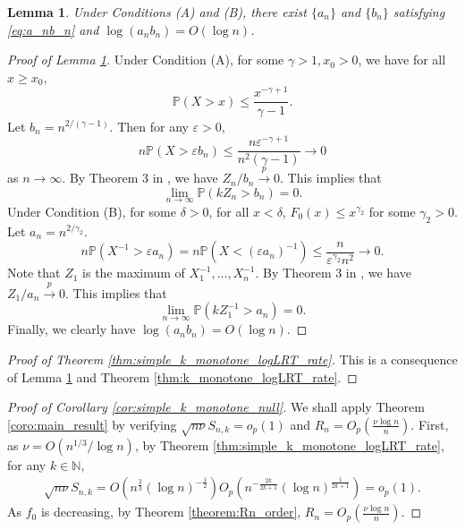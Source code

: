 \documentclass[12pt,letterpaper, twoside, openany]{article}
\theoremstyle{plain}
\newtheorem{lemma}[theorem]{Lemma}
\begin{document}
\begin{lemma}\label{lemma:anbn_logn_hall}
    Under Conditions (A) and (B), there exist $\{a_n\}$ and $\{b_n\}$ satisfying \eqref{eq:a_nb_n} and $\log (a_n b_n) = O(\log n)$.
\end{lemma}

\begin{proof}[Proof of Lemma \ref{lemma:anbn_logn_hall}]
Under Condition (A), for some $\gamma > 1, x_0 > 0$, we have for all $x \geq x_0$,
\begin{equation*}
    \mathbb{P}(X >x ) \leq \frac{x^{-\gamma+1}}{\gamma - 1}.
\end{equation*}
Let $b_n = n^{2/(\gamma-1)}$. Then for any $\varepsilon  > 0$,
\begin{equation*}
    n \mathbb{P}(X > \varepsilon b_n ) \leq \frac{n \varepsilon^{-\gamma+1}}{n^2(\gamma-1)}\rightarrow 0
\end{equation*}
as $n \rightarrow \infty$. By Theorem 3 in \cite{hall1979note}, we have $Z_n/b_n \stackrel{p}{\rightarrow} 0$. This implies that
\begin{equation*}
    \lim_{n \rightarrow \infty} \mathbb{P}(kZ_n > b_n) = 0.
\end{equation*}
Under Condition (B), for some $\delta > 0$, for all $x < \delta$, $F_0(x) \leq x^{\gamma_2}$ for some $\gamma_2 > 0$.  Let $a_n = n^{2/\gamma_2}$. 
\begin{equation*}
    n \mathbb{P}(X^{-1} > \varepsilon a_n) = n \mathbb{P}(X < (\varepsilon a_n)^{-1}) \leq \frac{n}{\varepsilon^{\gamma_2} n^2} \rightarrow 0.
\end{equation*}
Note that $Z_1$ is the maximum of $X^{-1}_1,\ldots,X^{-1}_n$. By Theorem 3 in \cite{hall1979note}, we have $Z_1/a_n \stackrel{p}{\rightarrow} 0$. This implies that
\begin{equation*}
    \lim_{n \rightarrow \infty} \mathbb{P}(kZ_1^{-1} > a_n) = 0.
\end{equation*}
Finally, we clearly have $\log (a_n b_n) = O(\log n)$.     
\end{proof}

\begin{proof}[Proof of Theorem \ref{thm:simple_k_monotone_logLRT_rate}]
This is a consequence of Lemma \ref{lemma:anbn_logn_hall} and Theorem \ref{thm:k_monotone_logLRT_rate}.
\end{proof}


\begin{proof}[Proof of Corollary \ref{cor:simple_k_monotone_null}]
We shall apply Theorem \ref{coro:main_result}  by verifying $\sqrt{n\nu} S_{n,k} = o_p(1)$ and $R_{n} = O_p(\frac{\nu \log n}{n})$. First, as $\nu = O(n^{1/3}/\log n)$, by Theorem \ref{thm:simple_k_monotone_logLRT_rate}, for any $k \in \mathbb{N}$,
\begin{align*}
    \sqrt{n\nu} S_{n,k} = O\left(n^{\frac{2}{3}} (\log n)^{-\frac{1}{2}}\right) O_p\left(n^{- \frac{2k}{2k+1}} (\log n)^{\frac{1}{2k+1}}\right) = o_p(1).
\end{align*}
As $f_0$ is decreasing, by Theorem \ref{theorem:Rn_order}, $R_{n} = O_p( \frac{\nu \log n}{n})$.
\end{proof}
\end{document}
